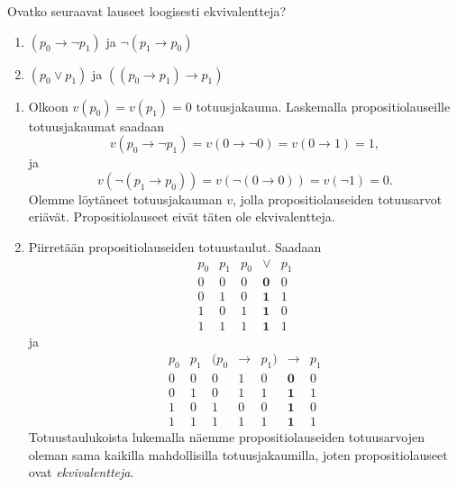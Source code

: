 \documentclass[11pt,a4paper]{amsart}
\begin{document}
\begin{exercise}
Ovatko seuraavat lauseet loogisesti ekvivalentteja?
\begin{enumerate}[label=\alph*), nosep]
\item \((p_0 \rightarrow \neg p_1)\) ja \(\neg(p_1 \rightarrow p_0)\)
\item \((p_0 \lor p_1)\) ja \(((p_0 \rightarrow p_1) \rightarrow p_1)\)
\end{enumerate}
\end{exercise}

\begin{solution}
\leavevmode\par
\begin{enumerate}[label=\alph*), nosep]
\item Olkoon \(v(p_0) = v(p_1) = 0\) totuusjakauma. Laskemalla
propositiolauseille totuusjakaumat saadaan
\[
v(p_0 \rightarrow \neg p_1) = v(0 \rightarrow \neg 0) = v(0 \rightarrow 1) = 1,
\]
ja
\[
v(\neg(p_1 \rightarrow p_0)) = v(\neg(0 \rightarrow 0)) = v(\neg 1) = 0.
\]
Olemme löytäneet totuusjakauman \(v\), jolla propositiolauseiden totuusarvot
eriävät. Propositiolauseet eivät täten ole ekvivalentteja.

\item Piirretään propositiolauseiden totuustaulut. Saadaan
\[
\begin{array}{cc|ccc}
p_0 & p_1 & p_0 & \boldsymbol{\lor} & p_1 \\
\hline
0 & 0 & 0 & \mathbf{0} & 0 \\
0 & 1 & 0 & \mathbf{1} & 1 \\
1 & 0 & 1 & \mathbf{1} & 0 \\
1 & 1 & 1 & \mathbf{1} & 1
\end{array}
\]
ja
\[
\begin{array}{cc|ccccc}
p_0 & p_1 & (p_0 & \rightarrow & p_1) & \boldsymbol{\rightarrow} & p_1 \\
\hline
0 & 0 & 0 & 1 & 0 & \mathbf{0} & 0 \\
0 & 1 & 0 & 1 & 1 & \mathbf{1} & 1 \\
1 & 0 & 1 & 0 & 0 & \mathbf{1} & 0 \\
1 & 1 & 1 & 1 & 1 & \mathbf{1} & 1
\end{array}
\]
Totuustaulukoista lukemalla näemme propositiolauseiden totuusarvojen
oleman sama kaikilla mahdollisilla totuusjakaumilla, joten propositiolauseet
ovat \emph{ekvivalentteja}.
\end{enumerate}
\end{solution}
\end{document}
